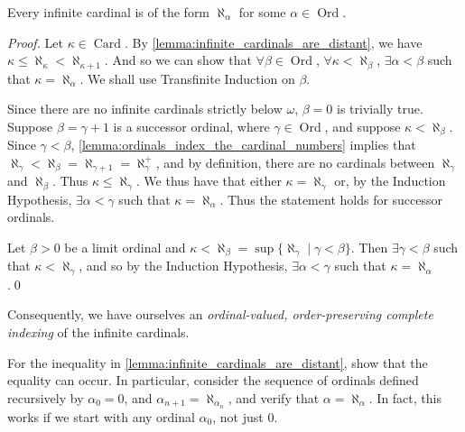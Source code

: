 \documentclass[notoc,notitlepage]{tufte-book}
\DeclareMathOperator{\Ord}{Ord }
\DeclareMathOperator{\Card}{Card }
\begin{document}
\begin{propo}\label{propo:all_infinite_cardinals_are_indexed_by_the_ordinals}
  Every infinite cardinal is of the form $\aleph_\alpha$ for some $\alpha \in \Ord$.
\end{propo}

\begin{proof}
  Let $\kappa \in \Card$. By \cref{lemma:infinite_cardinals_are_distant}, we have $\kappa \leq \aleph_\kappa < \aleph_{\kappa + 1}$. And so we can show that $\forall \beta \in \Ord$, $\forall \kappa < \aleph_\beta$, $\exists \alpha < \beta$ such that $\kappa = \aleph_\alpha$. We shall use Transfinite Induction on $\beta$.
  
  Since there are no infinite cardinals strictly below $\omega$, $\beta = 0$ is trivially true. Suppose $\beta = \gamma + 1$ is a successor ordinal, where $\gamma \in \Ord$, and suppose $\kappa < \aleph_\beta$. Since $\gamma < \beta$, \cref{lemma:ordinals_index_the_cardinal_numbers} implies that $\aleph_\gamma < \aleph_\beta = \aleph_{\gamma + 1} = \aleph_\gamma^+$, and by definition, there are no cardinals between $\aleph_\gamma$ and $\aleph_\beta$. Thus $\kappa \leq \aleph_\gamma$. We thus have that either $\kappa = \aleph_\gamma$ or, by the Induction Hypothesis, $\exists \alpha < \gamma$ such that $\kappa = \aleph_\alpha$. Thus the statement holds for successor ordinals.

  Let $\beta > 0$ be a limit ordinal and $\kappa < \aleph_\beta = \sup \{ \aleph_\gamma \mid \gamma < \beta \}$. Then $\exists \gamma < \beta$ such that $\kappa < \aleph_\gamma$, and so by the Induction Hypothesis, $\exists \alpha < \gamma$ such that $\kappa = \aleph_\alpha$.\qed\
\end{proof}

Consequently, we have ourselves an \textit{ordinal-valued, order-preserving complete indexing} of the infinite cardinals. 

\begin{ex}
  For the inequality in \cref{lemma:infinite_cardinals_are_distant}, show that the equality can occur. In particular, consider the sequence of ordinals defined recursively by $\alpha_0 = 0$, and $\alpha_{n + 1} = \aleph_{\alpha_n}$, and verify that $\alpha = \aleph_\alpha$. In fact, this works if we start with any ordinal $\alpha_0$, not just $0$.
\end{ex}

\end{document}
